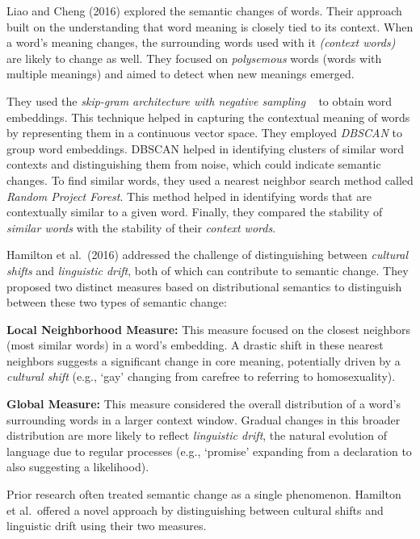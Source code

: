 Liao and Cheng (2016) explored the semantic changes of words.
Their approach built on the understanding that word meaning is closely tied to its context.
When a word's meaning changes, the surrounding words used with it \emph{(context words)} are likely to change as well.
They focused on \emph{polysemous} words (words with multiple meanings) and aimed to detect when new meanings emerged.

They used the \emph{skip-gram architecture with negative sampling} ~\cite{10.5555/2999792.2999959} to obtain word embeddings.
This technique helped in capturing the contextual meaning of words by representing them in a continuous vector space.
They employed \emph{DBSCAN} to group word embeddings.
DBSCAN helped in identifying clusters of similar word contexts and distinguishing them from noise, which could indicate semantic changes.
To find similar words, they used a nearest neighbor search method called \emph{Random Project Forest}.
This method helped in identifying words that are contextually similar to a given word.
 Finally, they compared the stability of \emph{similar words} with the stability of their \emph{context words}.

Hamilton et al.\ (2016) addressed the challenge of distinguishing between \emph{cultural shifts} and \emph{linguistic drift}, both of which can contribute to semantic change.
They proposed two distinct measures based on distributional semantics to distinguish between these two types of semantic change:
\begin{packed_enumerate}
    \item \textbf{Local Neighborhood Measure:}
    This measure focused on the closest neighbors (most similar words) in a word's embedding.
    A drastic shift in these nearest neighbors suggests a significant change in core meaning, potentially driven by a \emph{cultural shift}
    (e.g., `gay' changing from carefree to referring to homosexuality).
    \item \textbf{Global Measure:}
    This measure considered the overall distribution of a word's surrounding words in a larger context window.
    Gradual changes in this broader distribution are more likely to reflect \emph{linguistic drift}, the natural evolution of language due to regular processes
    (e.g., `promise' expanding from a declaration to also suggesting a likelihood).
\end{packed_enumerate}
Prior research often treated semantic change as a single phenomenon.
Hamilton et al.\ offered a novel approach by distinguishing between cultural shifts and linguistic drift using their two measures.

